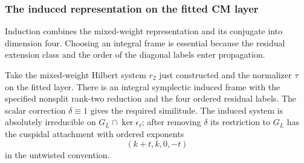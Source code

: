 

\subsubsection{The induced representation on the fitted CM layer}

Induction combines the mixed-weight representation and its conjugate into dimension four. Choosing an integral frame is essential because the residual extension class and the order of the diagonal labels enter propagation.

\begin{proposition}\label{prop:count-two-integral-induced-seed}
Take the mixed-weight Hilbert system \(r_2\) just constructed
and the normalizer \(\tau\) on the fitted layer. There is an
integral symplectic induced frame with the specified nonsplit
rank-two reduction and the four ordered residual labels.
The scalar correction \(\delta\equiv1\) gives the required
similitude. The induced system is absolutely irreducible on
\(G_L\cap\ker\epsilon_\ell\); after removing \(\delta\) its restriction to \(G_L\) has the cuspidal attachment with ordered exponents 
\[
 (k+t,k,0,-t)
\]
 in the untwisted convention.
\end{proposition}

